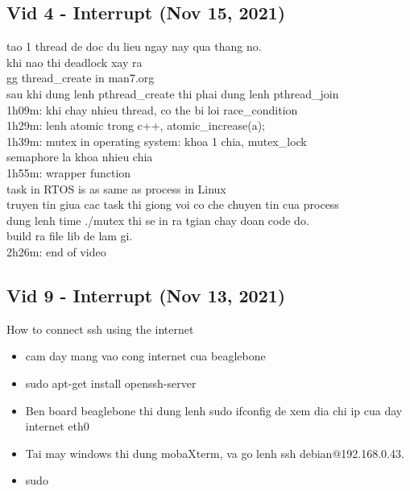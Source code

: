 \documentclass{article}
\begin{document}
\subsection{Vid 4 - Interrupt (Nov 15, 2021)}
tao 1 thread de doc du lieu ngay nay qua thang no.
\\khi nao thi deadlock xay ra
\\gg thread\_create in man7.org
\\sau khi dung lenh pthread\_create thi phai dung lenh pthread\_join
\\1h09m: khi chay nhieu thread, co the bi loi race\_condition
\\1h29m: lenh atomic trong c++, atomic\_increase(a);
\\1h39m: mutex in operating system: khoa 1 chia, mutex\_lock
\\semaphore la khoa nhieu chia
\\1h55m: wrapper function
\\task in RTOS is as same as process in Linux
\\truyen tin giua cac task thi giong voi co che chuyen tin cua process
\\dung lenh time ./mutex thi se in ra tgian chay doan code do.
\\build ra file lib de lam gi.
\\2h26m: end of video




\subsection{Vid 9 - Interrupt (Nov 13, 2021)}

How to connect ssh using the internet
\begin{itemize} 
  \item cam day mang vao cong internet cua beaglebone
  \item sudo apt-get install openssh-server
  \item Ben board beaglebone thi dung lenh sudo ifconfig de xem dia chi ip cua day internet eth0
  \item Tai may windows thi dung mobaXterm, va go lenh ssh debian@192.168.0.43.
  \item sudo 
\end{itemize}
\end{document}
